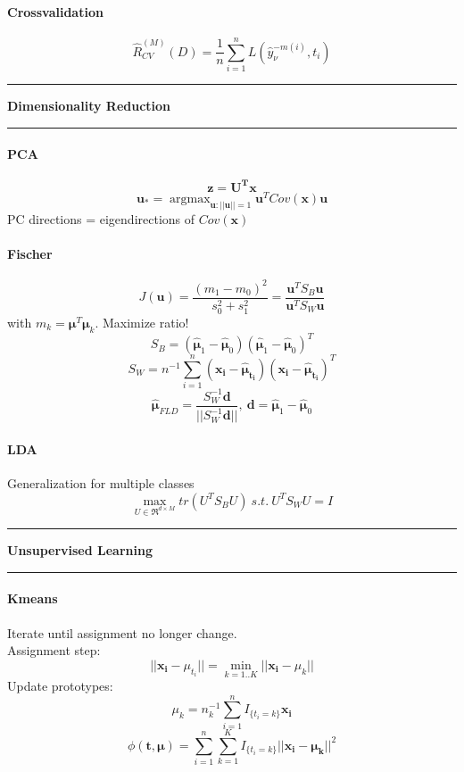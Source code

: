 \documentclass[7pt]{scrartcl}
\newlength{\secskip}
\renewcommand{\section}[1]{
  \vspace{\secskip}
  \hrule\vspace{.4em}
  \textbf{#1}
  \vspace{.4em}
  \hrule
  \vspace{\secskip}
}
\DeclareMathOperator*{\argmax}{argmax}
\renewcommand{\vec}{\mathbf}
\begin{document}
\begin{multicols}{4}
\paragraph{Crossvalidation}
\[\hat{R}_{CV}^{(M)}(D) = \frac{1}{n}\sum_{i=1}^n L(\hat{y}_\nu^{-m(i)},t_i)\]

\section{Dimensionality Reduction}
\paragraph{PCA}
\[\vec{z = U^T x}\]
\[\vec{u}_* = \argmax_{\vec{u}:||\vec{u}||=1} \vec{u}^T Cov(\vec{x}) \vec{u}\]
PC directions = eigendirections of $Cov(\vec{x})$
\paragraph{Fischer}
\[J(\vec{u}) = \frac{(m_1 - m_0)^2}{s_0^2 + s_1^2} = \frac{\vec{u}^T S_B \vec{u}}{\vec{u}^T S_W \vec{u}}\]
with $m_k = \vec{\mu}^T \vec{\mu}_k$. Maximize ratio!
\[S_B = (\hat{\vec{\mu}}_1 -\hat{\vec{\mu}}_0)(\hat{\vec{\mu}}_1 -\hat{\vec{\mu}}_0)^T\]
\[S_W = n^{-1} \sum_{i=1}^n(\vec{x_i} - \vec{\hat{\mu}_{t_i}})(\vec{x_i} - \vec{\hat{\mu}_{t_i}})^T\]
\[\vec{\hat{\mu}}_{FLD} = \frac{S_W^{-1} \vec{d}}{||S_W^{-1} \vec{d}||}, ~ \vec{d} = \hat{\vec{\mu}}_1 -\hat{\vec{\mu}}_0\]
\paragraph{LDA}
Generalization for multiple classes
\[\max_{U \in \Re^{d \times M}} tr(U^T S_B U) ~s.t.~ U^T S_WU = I\]

\section{Unsupervised Learning}
\paragraph{Kmeans}
Iterate until assignment no longer change.\\
Assignment step: \\
\[||\vec{x_i} - \mu_{t_i}|| = \min_{k=1..K} || \vec{x_i} - \mu_{k}||\]
Update prototypes: \\
\[\mu_k = n_k^{-1} \sum_{i=1}^n I_{\{t_i=k\}}\vec{x_i}\]
\[\phi(\vec{t,\mu}) = \sum_{i=1}^n\sum_{k=1}^K I_{\{t_i=k\}} || \vec{x_i} - \vec{\mu_k} || ^2\]

\end{multicols}
\end{document}
